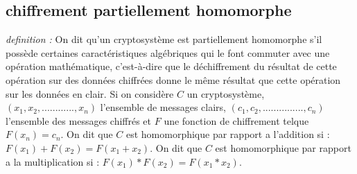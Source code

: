 \documentclass[a4paper,11pt]{report}
\begin{document}
\subsection{chiffrement partiellement homomorphe}
\textit{definition : } On dit qu'un cryptosystème est partiellement homomorphe  s'il possède certaines caractéristiques algébriques qui le font commuter avec une opération mathématique, c'est-à-dire que le déchiffrement du résultat de cette opération sur des données chiffrées donne le même résultat que cette opération sur les données en clair. \newline
Si on considère $C$ un cryptosystème, $(x_1, x_2, ............, x_n)$ l'ensemble de messages clairs, $(c_1, c_2, ..............., c_n)$ l'ensemble des messages chiffrés et $ F$ une fonction de chiffrement telque $F(x_n) = c_n$. \newline
On dit que $C$ est homomorphique par rapport a l'addition si : \newline
 $F(x_1) + F(x_2) = F(x_1 + x_2).$\newline
 On dit que $C$ est homomorphique par rapport a la multiplication si : \newline
 $F(x_1) * F(x_2) = F(x_1 * x_2).$\newline
\end{document}
